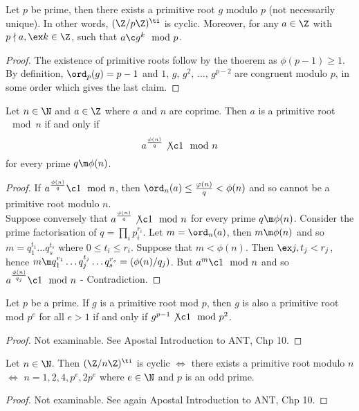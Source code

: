 \begin{ncor}
   Let $p$ be prime, then there exists a primitive root $g$ modulo $p$ (not necessarily unique). In other words, $(\Z/p\Z)^\ti$ is cyclic. Moreover, for any $a \in \Z$ with $p\nmid a, \ex k \in\Z$, such that $a \c g^k \mod p$.
\end{ncor}
\begin{proof}
  The existence of primitive roots follow by the thoerem as $\phi(p - 1) \ge 1$. By definition, $\ord_p(g) = p - 1$ and $1,\,g,\,g^2,\,\dots,\,g^{p-2}$ are congruent modulo $p$, in some order which gives the last claim.
\end{proof}

\begin{nthm}
  Let $n \in \N$ and $a \in \Z$ where $a$ and $n$ are coprime. Then $a$ is a primitive root $\mod n$ if and only if
  $$ a^{\frac{\phi(n)}{q}} \not\c 1 \mod n $$
  for every prime $q \m \phi(n)$.
\end{nthm}
\begin{proof}
  If $a^{\frac{\phi(n)}{q}} \c 1 \mod n$, then $\ord_n(a) \le \frac{\varphi(n)}{q} < \phi(n)$ and so cannot be a primitive root modulo $n$.\\
  Suppose conversely that $a^{\frac{\phi(n)}{q}} \not\c 1 \mod n$ for every prime $q \m \phi(n)$. Consider the prime factorisation of $q = \prod_{i} p_i^{r_i}$. Let $m = \ord_n(a)$, then $m \m \phi(n)$ and so $m = q_1^{t_1} \dots q_s^{t_s}$ where $0 \le t_i \le r_i$. Suppose that $m < \phi(n)$.
  Then $\ex j, t_j < r_j$, hence $m \m q_1^{r_1}\dots q_j^{t_j} \dots q_s^{r_s} = (\phi(n)/q_j)$. But $a^m \c 1 \mod n$ and so $a^{\frac{\phi(n) }{q_j}} \c 1 \mod n$ - Contradiction.
\end{proof}

\begin{nthm}
  Let $p$ be a prime. If $g$ is a primitive root mod $p$, then $g$ is also a primitive root mod $p^e$ for all $e > 1$ if and only if $g^{p-1} \not\c 1\mod p^2$.
\end{nthm}
\begin{proof}
  Not examinable. See Apostal Introduction to ANT, Chp 10.
\end{proof}

\begin{nthm}
  Let $n \in \N$. Then $(\Z/n\Z)^\ti$ is cyclic $\iff$ there exists a primitive root modulo $n$ $\iff$ $n = 1,2,4, p^e, 2p^{e}$ where $e \in \N$ and $p$ is an odd prime.
\end{nthm}
\begin{proof}
  Not examinable. See again Apostal Introduction to ANT, Chp 10.
\end{proof}

